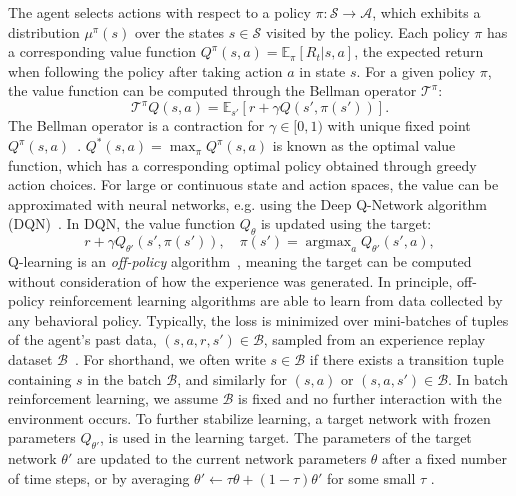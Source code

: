 \documentclass{article}
\newcommand{\y}{\gamma}
\newcommand{\ta}{\theta}
\newcommand{\E}{\mathbb{E}}
\newcommand{\B}{\mathcal{B}}
\DeclareMathOperator*{\argmax}{argmax}
\DeclareMathOperator{\oneargmax}{argmax}
\begin{document}
The agent selects actions with respect to a policy $\pi: \mathcal{S} \rightarrow \mathcal{A}$, which exhibits a distribution $\mu^\pi(s)$ over the states $s \in \mathcal{S}$ visited by the policy. Each policy $\pi$ has a corresponding value function $Q^\pi(s,a)=\E_\pi[R_t|s,a]$, the expected return when following the policy after taking action $a$ in state $s$. 
For a given policy $\pi$, the value function can be computed through the Bellman operator $\mathcal{T}^\pi$:
\begin{equation}
\mathcal{T}^\pi Q(s,a) = \E_{s'} [r + \y Q(s',\pi(s'))].
\end{equation}
The Bellman operator is a contraction for $\y \in [0,1)$ with unique fixed point $Q^\pi(s,a)$~\citep{bertsekas1995dynamic}. $Q^*(s,a) = \max_\pi Q^\pi(s,a)$ is known as the optimal value function, which has a corresponding optimal policy obtained through greedy action choices. 
For large or continuous state and action spaces, the value can be approximated with neural networks, e.g. using the Deep Q-Network algorithm (DQN)~\citep{DQN}. In DQN, the value function $Q_\ta$ is updated using the target: 
\begin{equation} \label{eqn:DQN}
r + \y Q_{\ta'}(s',\pi(s')), \quad \pi(s') = \oneargmax_a Q_{\ta'}(s',a),
\end{equation}
Q-learning is an \textit{off-policy} algorithm~\citep{sutton1998reinforcement}, meaning the target can be computed without consideration of how the experience was generated. 
In principle, off-policy reinforcement learning algorithms are able to learn from data collected by any behavioral policy. 
Typically, the loss is minimized over mini-batches of tuples of the agent's past data, $(s,a,r,s') \in \B$, sampled from an experience replay dataset $\B$~\citep{expreplay1992}. For shorthand, we often write $s \in \B$ if there exists a transition tuple containing $s$ in the batch $\B$, and similarly for $(s,a)$ or $(s,a,s') \in \B$. %
In batch reinforcement learning, we assume $\B$ is fixed and no further interaction with the environment occurs. 
To further stabilize learning, a target network with frozen parameters $Q_{\ta'}$, is used in the learning target. The parameters of the target network $\ta'$ are updated to the current network parameters $\ta$ after a fixed number of time steps, or by averaging $\ta' \leftarrow \tau \ta + (1 - \tau) \ta'$ for some small $\tau$ \citep{DDPG}. 
\end{document}
